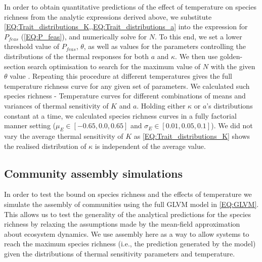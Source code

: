 \documentclass{article}
\begin{document}
In order to obtain quantitative predictions of the effect of temperature on species richness from the analytic expressions derived above,  we substitute \cref{EQ:Trait_distributions_K,,EQ:Trait_distributions_a} into the expression for $P_{feas}$ (\cref{EQ:P_feas}), and numerically solve for $N$. To this end, we set a lower threshold value of $P_{feas}$, $\theta$, as well as values for the parameters controlling the distributions of the thermal responses for both $a$ and $\kappa$. We then use golden-section search optimisation to search for the maximum value of $N$ with the given $\theta$ value \citep{Mogensen2018}. Repeating this procedure at different temperatures gives the full temperature richness curve for any given set of parameters. We calculated such species richness - Temperature curves for different combinations of means and variances of thermal sensitivity of $K$ and $a$. Holding either $\kappa$ or $a$'s distributions constant at a time, we calculated species richness curves in a fully factorial manner setting ($\mu_{E} \in [-0.65, 0.0, 0.65]$ and $\sigma_{E} \in [0.01, 0.05, 0.1]$). We did not vary the average thermal sensitivity of $K$ as \cref{EQ:Trait_distributions_K} shows the realised distribution of $\kappa$ is independent of the average value.

\subsection*{Community assembly simulations}

In order to test the bound on species richness and the effects of temperature we simulate the assembly of communities using the full GLVM model in \cref{EQ:GLVM}. This allows us to test the generality of the analytical predictions for the species richness by relaxing the assumptions made by the mean-field approximation about ecosystem dynamics. We use assembly here as a way to allow systems to reach the maximum species richness (i.e., the prediction generated by the model) given the distributions of thermal sensitivity parameters and temperature. 
\end{document}
